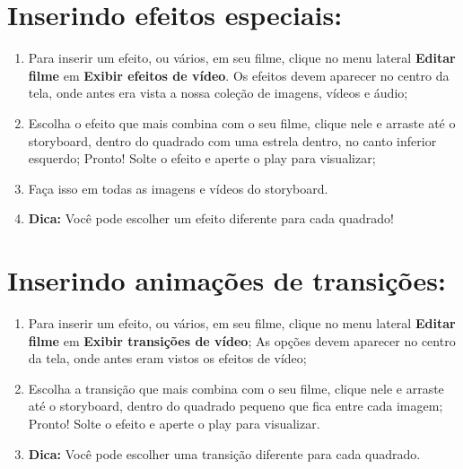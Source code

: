 \documentclass{article}
\begin{document}
\newpage

\section{Inserindo efeitos especiais:}
\begin{enumerate}
\item Para inserir um efeito, ou vários, em seu filme, clique no menu lateral \textbf{Editar filme} em \textbf{Exibir efeitos de vídeo}. Os efeitos devem aparecer no centro da tela, onde antes era vista a nossa coleção de imagens, vídeos e áudio;
\item Escolha o efeito que mais combina com o seu filme, clique nele e arraste até o storyboard, dentro do quadrado com uma estrela dentro, no canto inferior
esquerdo; Pronto! Solte o efeito e aperte o play para visualizar;
\item Faça isso em todas as imagens e vídeos do storyboard. 
\item \textbf{Dica:} Você pode escolher um efeito diferente para cada quadrado!
\end{enumerate}

\section{Inserindo animações de transições:}
\begin{enumerate}
\item Para inserir um efeito, ou vários, em seu filme, clique no menu lateral \textbf{Editar filme} em \textbf{Exibir transições de vídeo}; As opções devem aparecer no centro da tela, onde antes eram vistos os efeitos de vídeo;
\item Escolha a transição que mais combina com o seu filme, clique nele e arraste até o storyboard, dentro do quadrado pequeno que fica entre cada imagem;
Pronto! Solte o efeito e aperte o play para visualizar.
\item \textbf{Dica:} Você pode escolher uma transição diferente para cada quadrado.
\end{enumerate}
\end{document}
